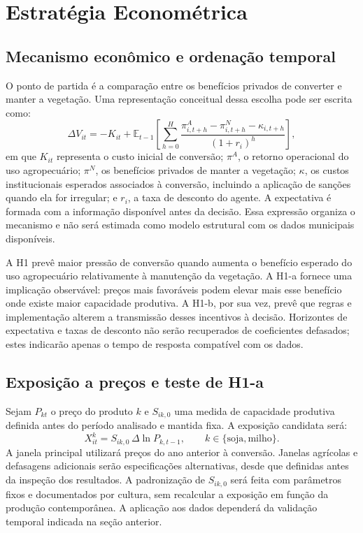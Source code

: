\section{Estratégia Econométrica}
\label{sec:estrategia}

\subsection{Mecanismo econômico e ordenação temporal}

O ponto de partida é a comparação entre os benefícios privados de converter e manter a vegetação. Uma representação conceitual dessa escolha pode ser escrita como:
\begin{equation}
 \Delta V_{it}
 =-K_{it}+
 \mathbb{E}_{t-1}\!\left[
  \sum_{h=0}^{H}\frac{\pi^{A}_{i,t+h}-\pi^{N}_{i,t+h}
  -\kappa_{i,t+h}}{(1+r_i)^h}
 \right],
 \label{eq:valor}
\end{equation}
em que $K_{it}$ representa o custo inicial de conversão; $\pi^{A}$, o retorno operacional do uso agropecuário; $\pi^{N}$, os benefícios privados de manter a vegetação; $\kappa$, os custos institucionais esperados associados à conversão, incluindo a aplicação de sanções quando ela for irregular; e $r_i$, a taxa de desconto do agente. A expectativa é formada com a informação disponível antes da decisão. Essa expressão organiza o mecanismo e não será estimada como modelo estrutural com os dados municipais disponíveis.

A H1 prevê maior pressão de conversão quando aumenta o benefício esperado do uso agropecuário relativamente à manutenção da vegetação. A H1-a fornece uma implicação observável: preços mais favoráveis podem elevar mais esse benefício onde existe maior capacidade produtiva. A H1-b, por sua vez, prevê que regras e implementação alterem a transmissão desses incentivos à decisão. Horizontes de expectativa e taxas de desconto não serão recuperados de coeficientes defasados; estes indicarão apenas o tempo de resposta compatível com os dados.

\subsection{Exposição a preços e teste de H1-a}

Sejam $P_{kt}$ o preço do produto $k$ e $S_{ik,0}$ uma medida de capacidade produtiva definida antes do período analisado e mantida fixa. A exposição candidata será:
\begin{equation}
 X_{it}^{k}=S_{ik,0}\,\Delta\ln P_{k,t-1},
 \qquad k\in\{\text{soja},\text{milho}\}.
 \label{eq:exposicao}
\end{equation}
A janela principal utilizará preços do ano anterior à conversão. Janelas agrícolas e defasagens adicionais serão especificações alternativas, desde que definidas antes da inspeção dos resultados. A padronização de $S_{ik,0}$ será feita com parâmetros fixos e documentados por cultura, sem recalcular a exposição em função da produção contemporânea. A aplicação aos dados dependerá da validação temporal indicada na seção anterior.

